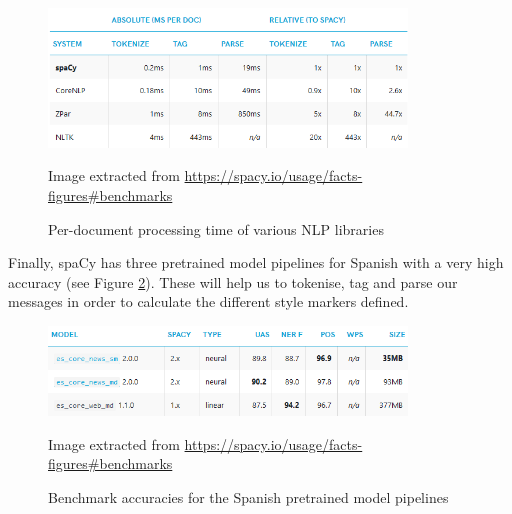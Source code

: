 \begin{figure}[h]
	\centering%
	\includegraphics[width = 0.85\textwidth]{Imagenes/Bitmap/Spacy/spacyspeed.png}%
	\caption{Per-document processing time of various NLP libraries}%
	Image extracted from \url{https://spacy.io/usage/facts-figures#benchmarks}
	\label{fig:spacyspeed}
\end{figure}

Finally, spaCy has three pretrained model pipelines for Spanish with a very high accuracy (see Figure \ref{fig:spacymodel}). These will help us to tokenise, tag and parse our messages in order to calculate the different style markers defined.

\begin{figure}[h]
	\centering%
	\includegraphics[width = 0.85\textwidth]{Imagenes/Bitmap/Spacy/spacymodel.png}%
	\caption{Benchmark accuracies for the Spanish pretrained model pipelines}%
	Image extracted from \url{https://spacy.io/usage/facts-figures#benchmarks}
	\label{fig:spacymodel}
\end{figure}